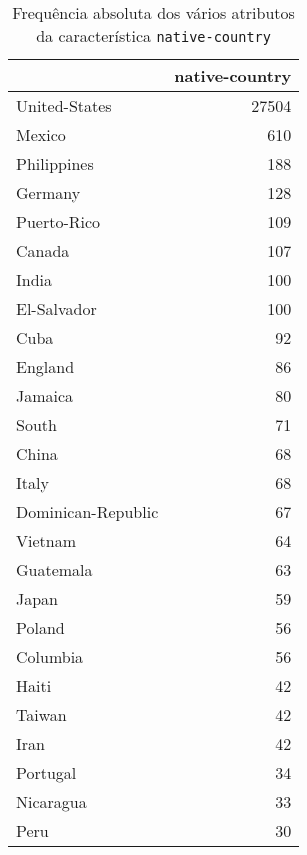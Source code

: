 \begin{table}
\centering
\caption{Frequência absoluta dos vários atributos da característica \texttt{native-country}}
\begin{tabular}{lr}
\toprule
{} &  native-country \\
\midrule
 United-States              &           27504 \\
 Mexico                     &             610 \\
 Philippines                &             188 \\
 Germany                    &             128 \\
 Puerto-Rico                &             109 \\
 Canada                     &             107 \\
 India                      &             100 \\
 El-Salvador                &             100 \\
 Cuba                       &              92 \\
 England                    &              86 \\
 Jamaica                    &              80 \\
 South                      &              71 \\
 China                      &              68 \\
 Italy                      &              68 \\
 Dominican-Republic         &              67 \\
 Vietnam                    &              64 \\
 Guatemala                  &              63 \\
 Japan                      &              59 \\
 Poland                     &              56 \\
 Columbia                   &              56 \\
 Haiti                      &              42 \\
 Taiwan                     &              42 \\
 Iran                       &              42 \\
 Portugal                   &              34 \\
 Nicaragua                  &              33 \\
 Peru                       &              30 \\

\end{tabular}
\end{table}
